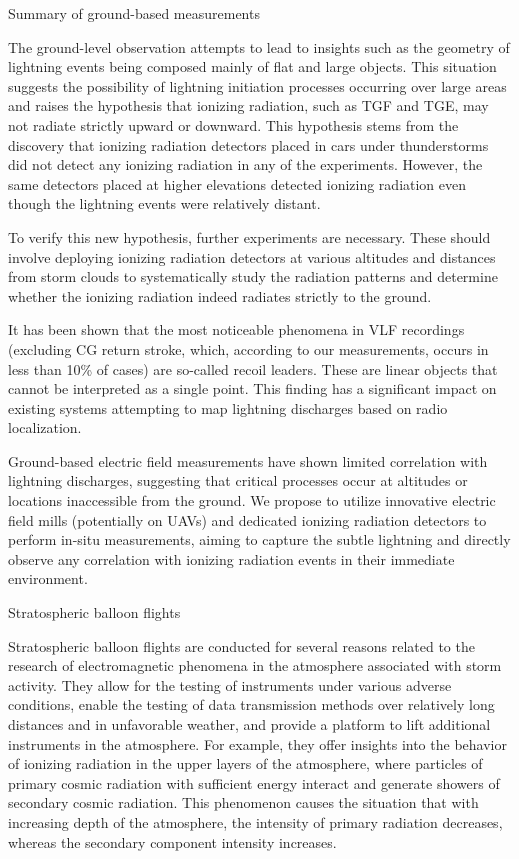 \secc Summary of ground-based measurements

The ground-level observation attempts to lead to insights such as the geometry of lightning events being composed mainly of flat and large objects. This situation suggests the possibility of lightning initiation processes occurring over large areas and raises the hypothesis that ionizing radiation, such as TGF and TGE, may not radiate strictly upward or downward. This hypothesis stems from the discovery that ionizing radiation detectors placed in cars under thunderstorms did not detect any ionizing radiation in any of the experiments. However, the same detectors placed at higher elevations detected ionizing radiation even though the lightning events were relatively distant.

To verify this new hypothesis, further experiments are necessary. These should involve deploying ionizing radiation detectors at various altitudes and distances from storm clouds to systematically study the radiation patterns and determine whether the ionizing radiation indeed radiates strictly to the ground.

It has been shown that the most noticeable phenomena in VLF recordings (excluding CG return stroke, which, according to our measurements, occurs in less than 10\% of cases) are so-called recoil leaders. These are linear objects that cannot be interpreted as a single point. This finding has a significant impact on existing systems attempting to map lightning discharges based on radio localization.

Ground-based electric field measurements have shown limited correlation with lightning discharges, suggesting that critical processes occur at altitudes or locations inaccessible from the ground. We propose to utilize innovative electric field mills (potentially on UAVs) and dedicated ionizing radiation detectors to perform in-situ measurements, aiming to capture the subtle lightning and directly observe any correlation with ionizing radiation events in their immediate environment.

 Stratospheric balloon flights

Stratospheric balloon flights are conducted for several reasons related to the research of electromagnetic phenomena in the atmosphere associated with storm activity. They allow for the testing of instruments under various adverse conditions, enable the testing of data transmission methods over relatively long distances and in unfavorable weather, and provide a platform to lift additional instruments in the atmosphere. For example, they offer insights into the behavior of ionizing radiation in the upper layers of the atmosphere, where particles of primary cosmic radiation with sufficient energy interact and generate showers of secondary cosmic radiation. This phenomenon causes the situation that with increasing depth of the atmosphere, the intensity of primary radiation decreases, whereas the secondary component intensity increases.

